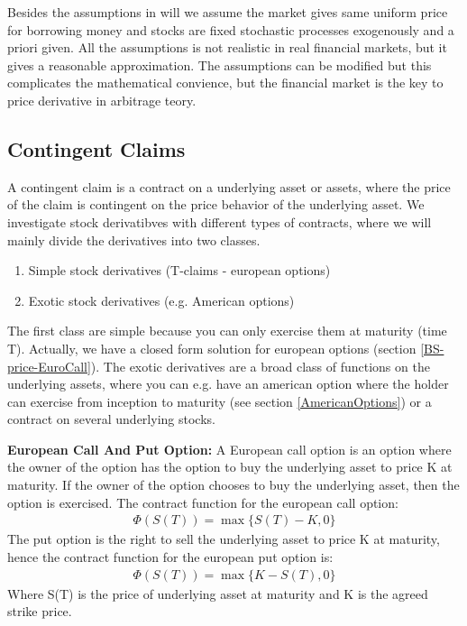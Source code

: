 Besides the assumptions in \parencite{finKont} will we assume the market gives same uniform price for borrowing money and stocks are fixed stochastic processes exogenously and a priori given. All the assumptions is not realistic in real financial markets, but it gives a reasonable approximation.  The assumptions can be modified but this complicates the mathematical convience, but the financial market is the key to price derivative in arbitrage teory.


\subsection{Contingent Claims}
A contingent claim is a contract on a underlying asset or assets, where the price of the claim is contingent on the price behavior of the underlying asset. We investigate stock derivatibves with different types of contracts, where we will mainly divide the derivatives into two classes. 
\begin{enumerate}
\item Simple stock derivatives (T-claims - european options)
\item Exotic stock derivatives (e.g. American options)
\end{enumerate}
The first class are simple because you can only exercise them at maturity (time T). Actually, we have a closed form solution for european options (section \ref{BS-price-EuroCall}). The exotic derivatives are a broad class of functions on the underlying assets, where you can e.g. have an american option where the holder can exercise from inception to maturity (see section \ref{AmericanOptions}) or a contract on several underlying stocks.

\theoremstyle{definition}
\begin{definition}{\textbf{European Call And Put Option:}}\label{def:CallOptions}
A European call option is an option where the owner of the option has the option to buy the underlying asset to price K at maturity. If the owner of the option chooses to buy the underlying asset, then the option is exercised. The contract function for the european call option:
\begin{equation}
\begin{split}
\Phi(S(T))=\max\{S(T)-K, 0\}
\end{split}
\end{equation}
The put option is the right to sell the underlying asset to price K at maturity, hence the contract function for the european put option is:
\begin{equation}
\begin{split}
\Phi(S(T))=\max\{K-S(T), 0\}
\end{split}
\end{equation}
Where S(T) is the price of underlying asset at maturity and K is the agreed strike price.
\end{definition}

